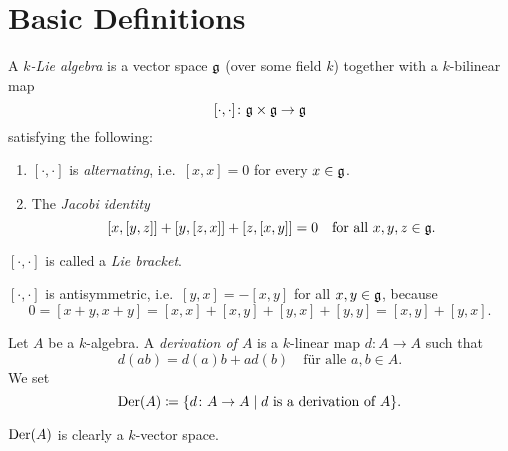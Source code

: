 \section{Basic Definitions}


\begin{defi}
 A \emph{$k$-Lie algebra} is a vector space $\mathfrak{g}$ (over some field $k$) together with a $k$-bilinear map
 \[
  [\cdot, \cdot] \colon \mathfrak{g} \times \mathfrak{g} \to \mathfrak{g}
 \]
 satisfying the following:
 \begin{enumerate}
  \item
   $[\cdot, \cdot]$ is \emph{alternating}, i.e.\ $[x,x] = 0$ for every $x \in \mathfrak{g}$.
  \item
   The \emph{Jacobi identity}
   \[
    [x,[y,z]] + [y,[z,x]] + [z,[x,y]] = 0
    \quad
    \text{for all $x,y,z \in \mathfrak{g}$}.
   \]
 \end{enumerate}
 $[\cdot,\cdot]$ is called a \emph{Lie bracket}.
\end{defi}


\begin{rem}
 $[\cdot, \cdot]$ is antisymmetric, i.e.\ $[y,x] = -[x,y]$ for all $x,y \in \mathfrak{g}$, because
 \[
  0 = [x+y, x+y] = [x,x] + [x,y] + [y,x] + [y,y] = [x,y] + [y,x].
 \]
\end{rem}


\begin{defi}
 Let $A$ be a $k$-algebra. A \emph{derivation of $A$} is a $k$-linear map $d \colon A \to A$ such that
 \[
  d(ab) = d(a)b + ad(b) \quad \text{für alle $a,b \in A$}.
 \]
 We set
 \[
  \operatorname{Der}(A) \coloneqq \{d \colon A \to A \mid \text{$d$ is a derivation of $A$} \}.
 \]
\end{defi}


\begin{rem}
 $\operatorname{Der}(A)$ is clearly a $k$-vector space.
\end{rem}


